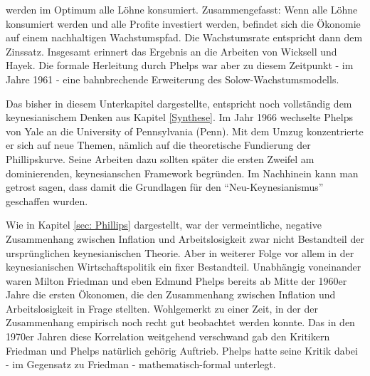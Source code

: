 werden im Optimum alle Löhne konsumiert. Zusammengefasst: Wenn alle Löhne konsumiert werden und alle Profite investiert werden, befindet sich die Ökonomie auf einem nachhaltigen Wachstumspfad. Die Wachstumsrate entspricht dann dem Zinssatz. Insgesamt erinnert das Ergebnis an die Arbeiten von Wicksell und Hayek. Die formale Herleitung durch Phelps war aber zu diesem Zeitpunkt - im Jahre 1961 - eine bahnbrechende Erweiterung des Solow-Wachstumsmodells.

Das bisher in diesem Unterkapitel dargestellte, entspricht noch vollständig dem keynesianischem Denken aus Kapitel \ref{Synthese}. Im Jahr 1966 wechselte Phelps von Yale an die University of Pennsylvania (Penn). Mit dem Umzug konzentrierte er sich auf neue Themen, nämlich auf die theoretische Fundierung der Phillipskurve. Seine Arbeiten dazu sollten später die ersten Zweifel am dominierenden, keynesianschen Framework begründen. Im Nachhinein kann man getrost sagen, dass damit die Grundlagen für den "`Neu-Keynesianismus"' geschaffen wurden.

Wie in Kapitel \ref{sec: Phillips} dargestellt, war der vermeintliche, negative Zusammenhang zwischen Inflation und Arbeitslosigkeit zwar nicht Bestandteil der ursprünglichen keynesianischen Theorie. Aber in weiterer Folge vor allem in der keynesianischen Wirtschaftspolitik ein fixer Bestandteil. Unabhängig voneinander waren Milton Friedman und eben Edmund Phelps bereits ab Mitte der 1960er Jahre die ersten Ökonomen, die den Zusammenhang zwischen Inflation und Arbeitslosigkeit in Frage stellten. Wohlgemerkt zu einer Zeit, in der der Zusammenhang empirisch noch recht gut beobachtet werden konnte. Das in den 1970er Jahren diese Korrelation weitgehend verschwand gab den Kritikern Friedman und Phelps natürlich gehörig Auftrieb. Phelps hatte seine Kritik dabei - im Gegensatz zu Friedman - mathematisch-formal unterlegt. 

